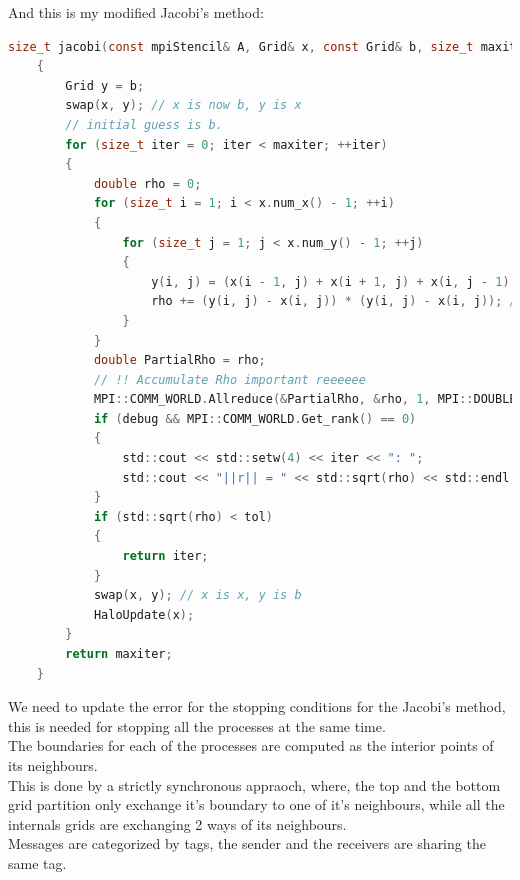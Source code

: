 \documentclass[]{article}
\begin{document}
                And this is my modified Jacobi's method: 
                \begin{lstlisting}[language=c]
    size_t jacobi(const mpiStencil& A, Grid& x, const Grid& b, size_t maxiter, double tol, bool debug = false) 
    {
        Grid y = b;
        swap(x, y); // x is now b, y is x 
        // initial guess is b.
        for (size_t iter = 0; iter < maxiter; ++iter) 
        {
            double rho = 0;
            for (size_t i = 1; i < x.num_x() - 1; ++i) 
            {
                for (size_t j = 1; j < x.num_y() - 1; ++j) 
                {
                    y(i, j) = (x(i - 1, j) + x(i + 1, j) + x(i, j - 1) + x(i, j + 1)) / 4.0;
                    rho += (y(i, j) - x(i, j)) * (y(i, j) - x(i, j)); // Delta
                }
            }
            double PartialRho = rho;
            // !! Accumulate Rho important reeeeee
            MPI::COMM_WORLD.Allreduce(&PartialRho, &rho, 1, MPI::DOUBLE, MPI::SUM);
            if (debug && MPI::COMM_WORLD.Get_rank() == 0) 
            {
                std::cout << std::setw(4) << iter << ": ";
                std::cout << "||r|| = " << std::sqrt(rho) << std::endl;
            }
            if (std::sqrt(rho) < tol) 
            {
                return iter;
            }
            swap(x, y); // x is x, y is b 
            HaloUpdate(x);
        }
        return maxiter;
    }
                \end{lstlisting}
                We need to update the error for the stopping conditions for the Jacobi's method, this is needed for stopping all the processes at the same time.
                \\[1.1em]
                The boundaries for each of the processes are computed as the interior points of its neighbours. 
                \\[1.1em]
                This is done by a strictly synchronous appraoch, where, the top and the bottom grid partition only exchange it's boundary to one of it's neighbours, while all the internals grids are exchanging 2 ways of its neighbours. 
                \\[1.1em]
                Messages are categorized by tags, the sender and the receivers are sharing the same tag. 
\end{document}
